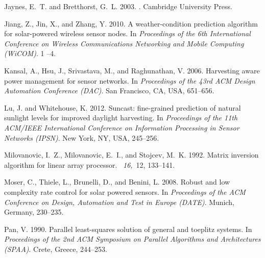 \documentclass[prodmode,acmtosn]{acmsmall}
\begin{document}
\begin{thebibliography}{}
{\sc Jaynes, E.~T.} {\sc and} {\sc Bretthorst, G.~L.} 2003.
.
\newblock Cambridge University Press.

{\sc Jiang, Z.}, {\sc Jin, X.}, {\sc and} {\sc Zhang, Y.} 2010.
\newblock A weather-condition prediction algorithm for solar-powered wireless
  sensor nodes.
\newblock In {\em Proceedings of the 6th International Conference on Wireless
  Communications Networking and Mobile Computing (WiCOM)}. 1 --4.

{\sc Kansal, A.}, {\sc Hsu, J.}, {\sc Srivastava, M.}, {\sc and} {\sc
  Raghunathan, V.} 2006.
\newblock Harvesting aware power management for sensor networks.
\newblock In {\em Proceedings of the 43rd ACM Design Automation Conference
  (DAC)}. San Francisco, {CA,} {USA}, 651--656.

{\sc Lu, J.} {\sc and} {\sc Whitehouse, K.} 2012.
\newblock Suncast: fine-grained prediction of natural sunlight levels for
  improved daylight harvesting.
\newblock In {\em Proceedings of the 11th ACM/IEEE International Conference on
  Information Processing in Sensor Networks (IPSN)}. New York, NY, USA,
  245--256.

{\sc Milovanovic, I.~Z.}, {\sc Milovanovic, E.~I.}, {\sc and} {\sc Stojcev,
  M.~K.} 1992.
\newblock Matrix inversion algorithm for linear array processor.
~{\em 16,\/}~12, 133--141.

{\sc Moser, C.}, {\sc Thiele, L.}, {\sc Brunelli, D.}, {\sc and} {\sc Benini,
  L.} 2008.
\newblock Robust and low complexity rate control for solar powered sensors.
\newblock In {\em Proceedings of the ACM Conference on Design, Automation and
  Test in Europe (DATE)}. Munich, Germany, 230--235.

{\sc Pan, V.} 1990.
\newblock Parallel least-squares solution of general and toeplitz systems.
\newblock In {\em Proceedings of the 2nd {ACM} Symposium on Parallel Algorithms
  and Architectures (SPAA)}. Crete, Greece, 244--253.


\end{thebibliography}
\end{document}
